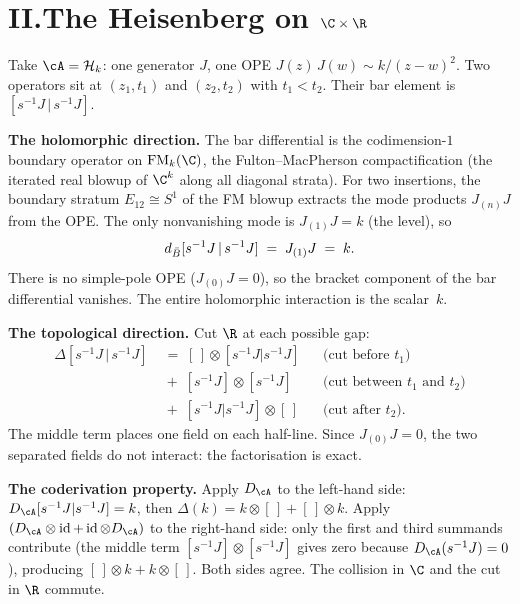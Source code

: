 \section*{II.\quad The Heisenberg on $\C \times \R$}

Take $\cA = \cH_k$: one generator $J$, one OPE
$J(z)\,J(w) \sim k/(z-w)^2$. Two operators sit at $(z_1, t_1)$
and $(z_2, t_2)$ with $t_1 < t_2$. Their bar element is
$[s^{-1}J \,|\, s^{-1}J]$.

\medskip
\noindent\textbf{The holomorphic direction.}\enspace
The bar differential is the codimension-$1$ boundary operator
on $\FM_k(\C)$, the Fulton--MacPherson compactification (the iterated real blowup of $\C^k$ along all diagonal strata). For two insertions, the boundary stratum
$E_{12} \cong S^1$ of the FM blowup extracts the mode products
$J_{(n)}J$ from the OPE. The only nonvanishing mode is
$J_{(1)}J = k$ (the level), so
\[
d_{\bar{B}}[s^{-1}J \,|\, s^{-1}J]
\;=\;
J_{(1)}J
\;=\; k.
\]
There is no simple-pole OPE ($J_{(0)}J = 0$), so the bracket
component of the bar differential vanishes. The entire
holomorphic interaction is the scalar~$k$.

\medskip
\noindent\textbf{The topological direction.}\enspace
Cut $\R$ at each possible gap:
\begin{align*}
\Delta[s^{-1}J \,|\, s^{-1}J]
&\;=\;
[\,] \otimes [s^{-1}J | s^{-1}J]
&&\text{(cut before $t_1$)}
\\
&\;+\;
[s^{-1}J] \otimes [s^{-1}J]
&&\text{(cut between $t_1$ and $t_2$)}
\\
&\;+\;
[s^{-1}J | s^{-1}J] \otimes [\,]
&&\text{(cut after $t_2$)}.
\end{align*}
The middle term places one field on each half-line. Since
$J_{(0)}J = 0$, the two separated fields do not interact: the
factorisation is exact.

\medskip
\noindent\textbf{The coderivation property.}\enspace
Apply $D_\cA$ to the left-hand side:
$D_\cA[s^{-1}J | s^{-1}J] = k$, then
$\Delta(k) = k \otimes [\,] + [\,] \otimes k$.
Apply $(D_\cA \otimes \id + \id \otimes D_\cA)$ to the
right-hand side: only the first and third summands contribute
(the middle term $[s^{-1}J] \otimes [s^{-1}J]$ gives zero because
$D_\cA(s^{-1}J) = 0$), producing $[\,] \otimes k + k \otimes [\,]$.
Both sides agree. The collision in $\C$ and the cut in $\R$
commute.

